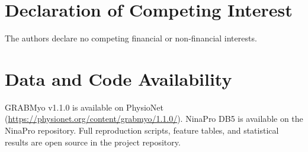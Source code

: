 \documentclass[11pt,a4paper]{article}
\begin{document}
\section*{Declaration of Competing Interest}
The authors declare no competing financial or non-financial interests.

\section*{Data and Code Availability}
GRABMyo v1.1.0 is available on PhysioNet (\url{https://physionet.org/content/grabmyo/1.1.0/}). NinaPro DB5 is available on the NinaPro repository. Full reproduction scripts, feature tables, and statistical results are open source in the project repository.



\end{document}

